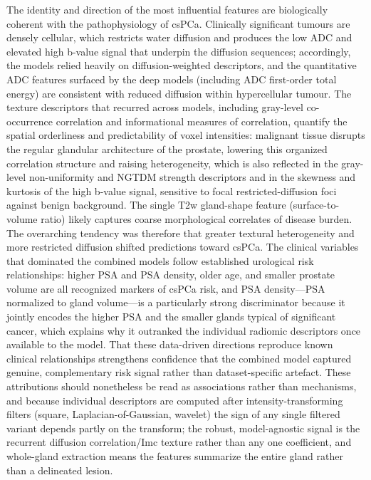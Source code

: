 \documentclass[11pt]{article}
\begin{document}
The identity and direction of the most influential features are biologically
coherent with the pathophysiology of csPCa. Clinically significant tumours are
densely cellular, which restricts water diffusion and produces the low ADC and
elevated high b-value signal that underpin the diffusion sequences; accordingly,
the models relied heavily on diffusion-weighted descriptors, and the quantitative
ADC features surfaced by the deep models (including ADC first-order total
energy) are consistent with reduced diffusion within hypercellular tumour. The
texture descriptors that recurred across models, including gray-level
co-occurrence correlation and informational measures of
correlation, quantify the spatial orderliness and predictability of voxel
intensities: malignant tissue disrupts the regular glandular architecture of the
prostate, lowering this organized correlation structure and raising
heterogeneity, which is also reflected in the gray-level non-uniformity and
NGTDM strength descriptors and in the skewness and kurtosis of the high b-value
signal, sensitive to focal restricted-diffusion foci against benign background.
The single T2w gland-shape feature (surface-to-volume ratio) likely captures
coarse morphological correlates of disease burden. The overarching tendency was
therefore that greater textural heterogeneity and more restricted diffusion
shifted predictions toward csPCa. The clinical variables that dominated the
combined models follow established urological risk relationships: higher PSA and
PSA density, older age, and smaller prostate volume are all recognized markers of
csPCa risk, and PSA density---PSA normalized to gland volume---is a particularly
strong discriminator because it jointly encodes the higher PSA and the smaller
glands typical of significant cancer, which explains why it outranked the
individual radiomic descriptors once available to the model. That these
data-driven directions reproduce known clinical relationships strengthens
confidence that the combined model captured genuine, complementary risk signal
rather than dataset-specific artefact. These attributions should nonetheless be read
as associations rather than mechanisms, and because individual descriptors are
computed after intensity-transforming filters (square, Laplacian-of-Gaussian,
wavelet) the sign of any single filtered variant depends partly on the
transform; the robust, model-agnostic signal is the recurrent diffusion
correlation/Imc texture rather than any one coefficient, and whole-gland
extraction means the features summarize the entire gland rather than a delineated
lesion.
\end{document}
